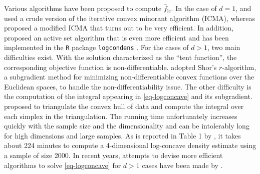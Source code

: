 \documentclass[12pt]{article}
\theoremstyle{definition}
\theoremstyle{theorem}
\theoremstyle{remark}
\begin{document}
Various algorithms have been proposed to compute $\hat{f}_{\mathrm{lc}}$. In the case of $d=1$, \textcites{Walther2002-tw} and \textcite{Pal2007-ai} used a crude version of the iterative convex minorant algorithm (ICMA), whereas \textcites{Rufibach2007-tl} proposed a modified ICMA that turns out to be very efficient. In addition, \textcites{Dumbgen2007-wa} proposed an active set algorithm that is even more efficient and has been implemented in the \texttt{R} package \texttt{logcondens} \parencites{Dumbgen2010-so}. For the cases of $d > 1$, two main difficulties exist. With the solution characterized as the ``tent function'', the corresponding objective function is non-differentiable. \textcite{Cule2010-lc} adopted Shor's $r$-algorithm, a subgradient method for minimizing non-differentiable convex functions over the Euclidean spaces, to handle the non-differentiability issue. The other difficulty is the computation of the integral appearing in \eqref{eq-logconcave} and its subgradient. \textcite{Cule2010-lc} proposed to triangulate the convex hull of data and compute the integral over each simplex in the triangulation. The running time unfortunately increases quickly with the sample size and the dimensionality and can be intolerably long for high dimensions and large samples. As is reported in Table 1 by \textcite{Cule2010-lc}, it takes about 224 minutes to compute a 4-dimensional log-concave density estimate using a sample of size 2000. In recent years, attempts to devise more efficient algorithms to solve \eqref{eq-logconcave} for $d > 1$ cases have been made by \textcites{Axelrod2019-xd, Rathke2019-xn, Chen2021-hf}. 
\end{document}
